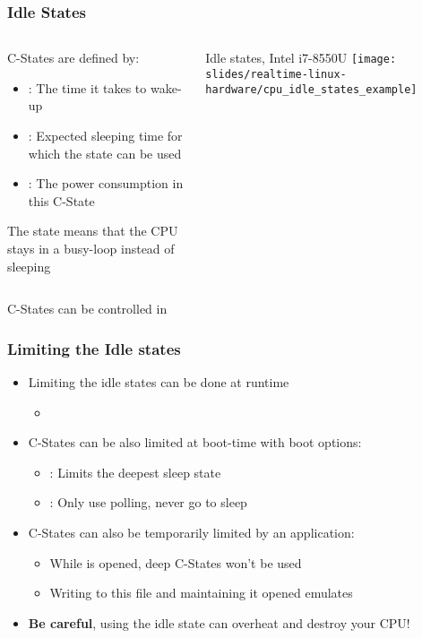 \begin{frame}
	\frametitle{Idle States}
	\begin{columns}
		\begin{column}{0.7\textwidth}
			C-States are defined by:
			\begin{itemize}
				\item {}: The time it takes to wake-up
				\item {}: Expected sleeping time for which the state can be used
				\item {}: The power consumption in this C-State
			\end{itemize}
			The  state means that the CPU stays in a busy-loop instead of sleeping
		\end{column}
		\begin{column}{0.3\textwidth}
			Idle states, Intel i7-8550U
		    \texttt{[image: slides/realtime-linux-hardware/cpu\_idle\_states\_example]}
		\end{column}
	\end{columns}
	\vspace{0.5cm}
C-States can be controlled in 
\end{frame}

\begin{frame}
	\frametitle{Limiting the Idle states}
	\begin{itemize}
		\item Limiting the idle states can be done at runtime
			\begin{itemize}
				\item {}
			\end{itemize}
		\item C-States can be also limited at boot-time with boot options:
			\begin{itemize}
				\item {}: Limits the deepest sleep state
				\item {}: Only use polling, never go to sleep
			\end{itemize}
		\item C-States can also be temporarily limited by an application:
			\begin{itemize}
				\item While  is opened, deep C-States won't be used
				\item Writing  to this file and maintaining it opened emulates 
			\end{itemize}
		\item \textbf{Be careful}, using the  idle state can overheat and destroy your CPU!
	\end{itemize}
\end{frame}

